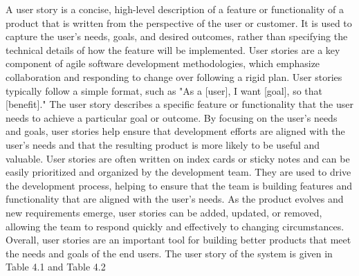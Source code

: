 \documentclass[12pt]{report}
\begin{document}
A user story is a concise, high-level description of a feature or functionality of a product that is written from the perspective of the user or customer. It is used to capture the user's needs, goals, and desired outcomes, rather than specifying the technical details of how the feature will be implemented. User stories are a key component of agile software development methodologies, which emphasize collaboration and responding to change over following a rigid plan.\newline \newline
User stories typically follow a simple format, such as "As a [user], I want [goal], so that [benefit]." The user story describes a specific feature or functionality that the user needs to achieve a particular goal or outcome. By focusing on the user's needs and goals, user stories help ensure that development efforts are aligned with the user's needs and that the resulting product is more likely to be useful and valuable.\newline \newline
User stories are often written on index cards or sticky notes and can be easily prioritized and organized by the development team. They are used to drive the development process, helping to ensure that the team is building features and functionality that are aligned with the user's needs. As the product evolves and new requirements emerge, user stories can be added, updated, or removed, allowing the team to respond quickly and effectively to changing circumstances. Overall, user stories are an important tool for building better products that meet the needs and goals of the end users. The user story of the system is given in Table 4.1 and Table 4.2
\newline
\end{document}
